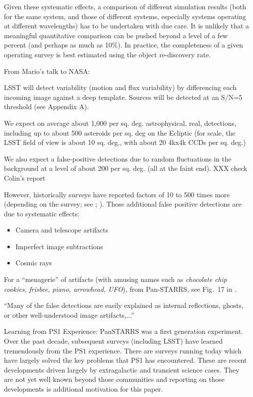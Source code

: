 \documentclass[12pt,preprint]{aastex}
\begin{document}
Given these systematic effects, a comparison of different simulation results (both for the same system,
and those of different systems, especially systems operating at different wavelengths) has to be undertaken
with due care. It is unlikely that a meaningful quantitative comparison can be pushed beyond a level
of a few percent (and perhaps as much as 10\%). In practice, the completeness of a given operating survey
is best estimated using the object re-discovery rate. 


From Mario's talk to NASA:

LSST will detect variability (motion and flux variability) by
differencing each incoming image against a deep template.
Sources will be detected at an S/N=5 threshold (see Appendix A). 

We expect on average about 1,000 per sq. deg. astrophysical, real,
detections, including up to about 500 asteroids per sq. deg on the 
Ecliptic (for scale, the LSST field of view is about 10 sq. deg., with 
about 20 4kx4k CCDs per sq. deg.)

We also expect a false-positive detections due to random
fluctuations in the background at a level of about 200 per
sq. deg. (all at the faint end).  XXX check Colin's report 

However, historically surveys have reported factors of 10 to 500 times
more (depending on the survey; see \citep{denneau13};
\citep{goldstein15} ). 
Those additional false positive
detections are due to systematic effects: 
\begin{itemize} 
\item Camera and telescope artifacts
\item Imperfect image subtractions
\item Cosmic rays
\end{itemize} 

For a ``menagerie'' of artifacts (with amusing names such as 
{\it chocolate chip cookies, frisbee, piano, arrowhead, UFO}), from
Pan-STARRS, see Fig.~17 in \cite{denneau13}. 


``Many of the false detections are easily explained as internal
reflections, ghosts, or other well-understood image artifacts,...''


Learning from PS1 Experience: PanSTARRS was a first generation
experiment. Over the past decade, subsequent surveys (including LSST) 
have learned tremendously from the PS1 experience. There are surveys 
running today which have largely solved the key problems that PS1 has encountered.
These are recent developments driven largely by extragalactic and
transient science cases. They are not yet well known beyond those
communities and reporting on those developments is additional
motivation for this paper. 
 
\end{document}
